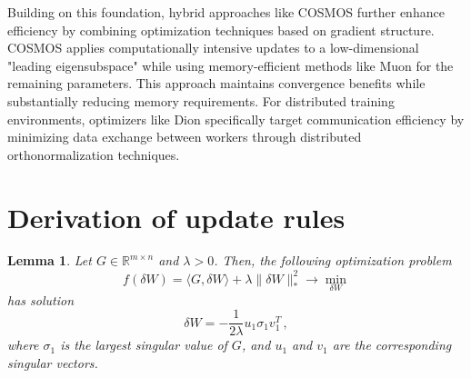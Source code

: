 \documentclass{article} %
\newtheorem{lemma}{Lemma}
\newcommand{\norm}[1]{\lVert #1\rVert}
\begin{document}
Building on this foundation, hybrid approaches like COSMOS \cite{chen2025cosmoshybridadaptive} further enhance efficiency by combining optimization techniques based on gradient structure. COSMOS applies computationally intensive updates to a low-dimensional "leading eigensubspace" while using memory-efficient methods like Muon for the remaining parameters. This approach maintains convergence benefits while substantially reducing memory requirements. For distributed training environments, optimizers like Dion \cite{ahn2025dioncommunicationefficientoptimizerlarge} specifically target communication efficiency by minimizing data exchange between workers through distributed orthonormalization techniques.

\section{Derivation of update rules}

\begin{lemma}\label{lem:opt_star}
Let $G \in \mathbb{R}^{m \times n}$ and $\lambda > 0$. Then, the following optimization problem
\begin{equation*} 
  f(\delta W) = \langle G, \delta W \rangle + \lambda \norm{\delta W}_*^2 \to \min_{\delta W}
\end{equation*}
has solution 
\begin{equation*}
  \delta W = -\frac{1}{2\lambda} u_1 \sigma_1 v_1^T\,,
\end{equation*}
where $\sigma_1$ is the largest singular value of $G$, and $u_1$ and $v_1$ are the corresponding singular vectors.
\end{lemma}
\end{document}
